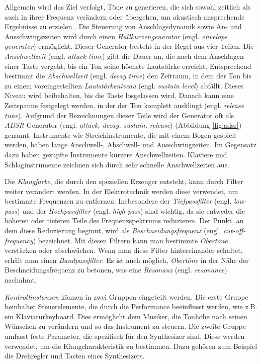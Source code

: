 \documentclass[
  a4paper,  %
  twoside,  %
  bibliography=totoc,
  headsepline,
  cleardoublepage=empty,
  parskip=half,
  draft=false
]{scrbook}
\begin{document}
Allgemein wird das Ziel verfolgt, Töne zu generieren, die sich sowohl zeitlich als auch in ihrer Frequenz verändern oder übergehen, um akustisch ansprechende Ergebnisse zu erzielen \cite{pirkle_designing_2021}. Die Steuerung von Anschlagsdynamik sowie An- und Ausschwingszeiten wird durch einen \emph{Hüllkurvengenerator} (engl. \emph{envelope generator}) ermöglicht. Dieser Generator besteht in der Regel aus vier Teilen. Die \emph{Anschwellzeit} (engl. \emph{attack time}) gibt die Dauer an, die nach dem Anschlagen einer Taste vergeht, bis ein Ton seine höchste Lautstärke erreicht. Entsprechend bestimmt die \emph{Abschwellzeit} (engl. \emph{decay time}) den Zeitraum, in dem der Ton bis zu einem voreingestellten \emph{Lautstärkeniveau} (engl. \emph{sustain level}) abfällt. Dieses Niveau wird beibehalten, bis die Taste losgelassen wird. Danach kann eine Zeitspanne festgelegt werden, in der der Ton komplett ausklingt (engl. \emph{release time}). Aufgrund der Bezeichnungen dieser Teile wird der Generator oft als \emph{ADSR}-Generator (engl. \emph{attack, decay, sustain, release}) (Abbildung \ref{fig:adsr}) genannt. Instrumente wie Streichinstrumente, die mit einem Bogen gespielt werden, haben lange Anschwell-, Abschwell- und Ausschwingzeiten. Im Gegensatz dazu haben gezupfte Instrumente kürzere Anschwellzeiten. Klaviere und Schlaginstrumente zeichnen sich durch sehr schnelle Anschwellzeiten aus. \cite{ruschkowski_elektronische_2019, russ_sound_2009}

Die \emph{Klangfarbe}, die durch den speziellen Erzeuger entsteht, kann durch Filter weiter verändert werden. In der Elektrotechnik werden diese verwendet, um bestimmte Frequenzen zu entfernen. Insbesondere der \emph{Tiefpassfilter} (engl. \emph{low-pass}) und der \emph{Hochpassfilter} (engl. \emph{high-pass}) sind wichtig, da sie entweder die höheren oder tieferen Teile des Frequenzspektrums reduzieren. Der Punkt, an dem diese Reduzierung beginnt, wird als \emph{Beschneidungsfrequenz} (engl. \emph{cut-off-frequency}) bezeichnet. Mit diesen Filtern kann man bestimmte \emph{Obertöne} verstärken oder abschwächen. Wenn man diese Filter hintereinander schaltet, erhält man einen \emph{Bandpassfilter}. Es ist auch möglich, \emph{Obertöne} in der Nähe der Beschneidungsfrequenz zu betonen, was eine \emph{Resonanz} (engl. \emph{resonance}) nachahmt. \cite{ruschkowski_elektronische_2019}

\emph{Kontrollinstanzen} können in zwei Gruppen eingeteilt werden. Die erste Gruppe beinhaltet Steuerelemente, die durch die Performance beeinflusst werden, wie z.B. ein Klaviaturkeyboard. Dies ermöglicht dem Musiker, die Tonhöhe nach seinen Wünschen zu verändern und so das Instrument zu steuern. Die zweite Gruppe umfasst feste Parameter, die spezifisch für den Synthesizer sind. Diese werden verwendet, um die Klangcharakteristik zu bestimmen. Dazu gehören zum Beispiel die Drehregler und Tasten eines Synthesizers. \cite{russ_sound_2009}
\end{document}
